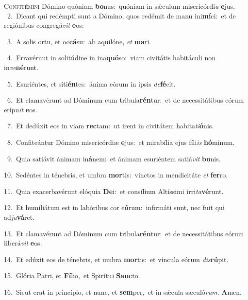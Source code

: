 \lettrine{\initial\textcolor{\initialcolor}{C}}{onfitémini} Dómino quóniam \textbf{bo}\-nus:~\star quóniam in sǽculum misericórdi\textit{a} \textbf{e}\-jus.\\
{\numbfont\textcolor{\numbcolor}{~2.}}~Dicant qui redémpti sunt a Dómino, quos redémit de manu ini\-\textbf{mí}\-ci:~\star et de regiónibus congregá\textit{vit} \textbf{e}\-os:\par
{\numbfont\textcolor{\numbcolor}{~3.}}~A solis ortu, et oc\-\textbf{cá}\-su:~\star ab aquilóne, \textit{et} \textbf{ma}\-ri.\par
{\numbfont\textcolor{\numbcolor}{~4.}}~Erravérunt in solitúdine in ina\-\textbf{quó}\-so:~\star viam civitátis habitáculi non in\-\textit{ve}\-\textbf{né}runt.\par
{\numbfont\textcolor{\numbcolor}{~5.}}~Esuriéntes, et siti\-\textbf{én}\-tes:~\star ánima eórum in ipsis \textit{de}\-\textbf{fé}cit.\par
{\numbfont\textcolor{\numbcolor}{~6.}}~Et clamavérunt ad Dóminum cum tribula\-\textbf{rén}\-tur:~\star et de necessitátibus eórum erípu\textit{it} \textbf{e}\-os.\par
{\numbfont\textcolor{\numbcolor}{~7.}}~Et dedúxit eos in viam \textbf{rec}\-tam:~\star ut irent in civitátem habita\-\textit{ti}\-\textbf{ó}nis.\par
{\numbfont\textcolor{\numbcolor}{~8.}}~Confiteántur Dómino misericórdiæ \textbf{e}\-jus:~\star et mirabília ejus fíli\textit{is} \textbf{hó}\-minum.\par
{\numbfont\textcolor{\numbcolor}{~9.}}~Quia satiávit ánimam in\-\textbf{á}\-nem:~\star et ánimam esuriéntem satiá\textit{vit} \textbf{bo}\-nis.\par
{\numbfont\textcolor{\numbcolor}{10.}}~Sedéntes in ténebris, et umbra \textbf{mor}\-tis:~\star vinctos in mendicitáte \textit{et} \textbf{fer}\-ro.\par
{\numbfont\textcolor{\numbcolor}{11.}}~Quia exacerbavérunt elóquia \textbf{De}\-i:~\star et consílium Altíssimi irri\-\textit{ta}\-\textbf{vé}runt.\par
{\numbfont\textcolor{\numbcolor}{12.}}~Et humiliátum est in labóribus cor e\-\textbf{ó}\-rum:~\star infirmáti sunt, nec fuit qui ad\-\textit{ju}\-\textbf{vá}ret.\par
{\numbfont\textcolor{\numbcolor}{13.}}~Et clamavérunt ad Dóminum cum tribula\-\textbf{rén}\-tur:~\star et de necessitátibus eórum liberá\textit{vit} \textbf{e}\-os.\par
{\numbfont\textcolor{\numbcolor}{14.}}~Et edúxit eos de ténebris, et umbra \textbf{mor}\-tis:~\star et víncula eórum \textit{dis}\-\textbf{rú}pit.\par
{\numbfont\textcolor{\numbcolor}{15.}}~Glória Patri, et \textbf{Fí}\-lio,~\star et Spirítu\textit{i} \textbf{Sanc}\-to.\par
{\numbfont\textcolor{\numbcolor}{16.}}~Sicut erat in princípio, et nunc, et \textbf{sem}\-per,~\star et in sǽcula sæculó\-\textit{rum}\-. \textbf{A}\-men.\par
